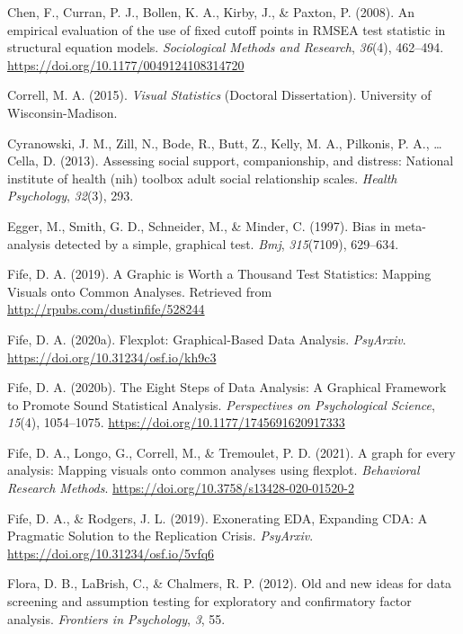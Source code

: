 \documentclass[
  english,
  man]{apa6}
\newlength{\cslhangindent}
\newenvironment{cslreferences}%
  {\setlength{\parindent}{0pt}%
  \everypar{\setlength{\hangindent}{\cslhangindent}}\ignorespaces}%
  {\par}
\begin{document}
\begin{cslreferences}
\leavevmode\hypertarget{ref-Chen2008}{}%
Chen, F., Curran, P. J., Bollen, K. A., Kirby, J., \& Paxton, P. (2008). An empirical evaluation of the use of fixed cutoff points in RMSEA test statistic in structural equation models. \emph{Sociological Methods and Research}, \emph{36}(4), 462--494. \url{https://doi.org/10.1177/0049124108314720}

\leavevmode\hypertarget{ref-Correll2015}{}%
Correll, M. A. (2015). \emph{Visual Statistics} (Doctoral Dissertation). University of Wisconsin-Madison.

\leavevmode\hypertarget{ref-cyranowski2013assessing}{}%
Cyranowski, J. M., Zill, N., Bode, R., Butt, Z., Kelly, M. A., Pilkonis, P. A., \ldots{} Cella, D. (2013). Assessing social support, companionship, and distress: National institute of health (nih) toolbox adult social relationship scales. \emph{Health Psychology}, \emph{32}(3), 293.

\leavevmode\hypertarget{ref-egger1997bias}{}%
Egger, M., Smith, G. D., Schneider, M., \& Minder, C. (1997). Bias in meta-analysis detected by a simple, graphical test. \emph{Bmj}, \emph{315}(7109), 629--634.

\leavevmode\hypertarget{ref-Fife2019b}{}%
Fife, D. A. (2019). A Graphic is Worth a Thousand Test Statistics: Mapping Visuals onto Common Analyses. Retrieved from \url{http://rpubs.com/dustinfife/528244}

\leavevmode\hypertarget{ref-Fife2019c}{}%
Fife, D. A. (2020a). Flexplot: Graphical-Based Data Analysis. \emph{PsyArxiv}. \url{https://doi.org/10.31234/osf.io/kh9c3}

\leavevmode\hypertarget{ref-Fife2019e}{}%
Fife, D. A. (2020b). The Eight Steps of Data Analysis: A Graphical Framework to Promote Sound Statistical Analysis. \emph{Perspectives on Psychological Science}, \emph{15}(4), 1054--1075. \url{https://doi.org/10.1177/1745691620917333}

\leavevmode\hypertarget{ref-Fifemapping}{}%
Fife, D. A., Longo, G., Correll, M., \& Tremoulet, P. D. (2021). A graph for every analysis: Mapping visuals onto common analyses using flexplot. \emph{Behavioral Research Methods}. \url{https://doi.org/10.3758/s13428-020-01520-2}

\leavevmode\hypertarget{ref-Fife2019a}{}%
Fife, D. A., \& Rodgers, J. L. (2019). Exonerating EDA, Expanding CDA: A Pragmatic Solution to the Replication Crisis. \emph{PsyArxiv}. \url{https://doi.org/10.31234/osf.io/5vfq6}

\leavevmode\hypertarget{ref-flora2012old}{}%
Flora, D. B., LaBrish, C., \& Chalmers, R. P. (2012). Old and new ideas for data screening and assumption testing for exploratory and confirmatory factor analysis. \emph{Frontiers in Psychology}, \emph{3}, 55.


\end{cslreferences}
\end{document}
